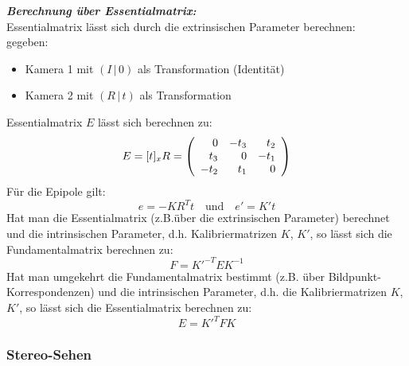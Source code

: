 \textbf{\textsl{Berechnung über Essentialmatrix:}} \\
Essentialmatrix lässt sich durch die extrinsischen Parameter berechnen: \\
gegeben:
\begin{itemize}
\item Kamera 1 mit $(I \, | \, 0)$ als Transformation (Identität)
\item Kamera 2 mit $(R \, | \, t)$ als Transformation
\end{itemize}
Essentialmatrix $E$ lässt sich berechnen zu: $$E = [t]_xR = \left( \begin{array}{rrr} 0 & -t_3 & t_2 \\ t_3 & 0 & -t_1 \\ -t_2 & t_1 & 0 \end{array} \right)$$ Für die Epipole gilt: $$e = -KR^Tt \quad \textrm{und} \quad e' = K't$$
Hat man die Essentialmatrix (z.B.über die extrinsischen Parameter) berechnet und die intrinsischen Parameter, d.h. Kalibriermatrizen $K$, $K'$, so lässt sich die Fundamentalmatrix berechnen zu: $$F = K'^{-T}EK^{-1}$$
Hat man umgekehrt die Fundamentalmatrix bestimmt (z.B. über Bildpunkt-Korrespondenzen) und die intrinsischen Parameter, d.h. die Kalibriermatrizen $K$, $K'$, so lässt sich die Essentialmatrix berechnen zu: $$E = K'^TFK$$

\subsubsection*{Stereo-Sehen}

